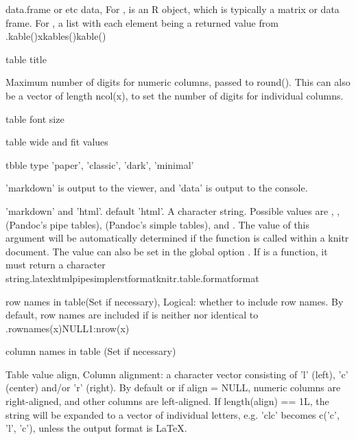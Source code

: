 \documentclass[a4paper]{book}
\begin{document}
\begin{Arguments}
\begin{ldescription}
\item[\code{data}] data.frame or etc data, For , is an R object, which is typically a matrix or data frame. For , a list with each element being a returned value from .kable()xkables()kable()

\item[\code{caption}] table title

\item[\code{digits}] Maximum number of digits for numeric columns, passed to round(). This can also be a vector of length ncol(x), to set the number of digits for individual columns.

\item[\code{font\_size}] table font size

\item[\code{full\_width}] table wide and fit values

\item[\code{table}] tbble type 'paper', 'classic', 'dark', 'minimal'

\item[\code{show}] 'markdown' is output to the viewer, and 'data' is output to the console.

\item[\code{format}] 'markdown' and 'html'. default 'html'. A character string. Possible values are , , (Pandoc's pipe tables), (Pandoc's simple tables), and . The value of this argument will be automatically determined if the function is called within a knitr document. The value can also be set in the global option . If is a function, it must return a character string.latexhtmlpipesimplerstformatknitr.table.formatformat

\item[\code{row.names}] row names in table(Set if necessary), Logical: whether to include row names. By default, row names are included if is neither nor identical to .rownames(x)NULL1:nrow(x)

\item[\code{col.names}] column names in table (Set if necessary)

\item[\code{align}] Table value align, Column alignment: a character vector consisting of 'l' (left), 'c' (center) and/or 'r' (right). By default or if align = NULL, numeric columns are right-aligned, and other columns are left-aligned. If length(align) == 1L, the string will be expanded to a vector of individual letters, e.g. 'clc' becomes c('c', 'l', 'c'), unless the output format is LaTeX.


\end{ldescription}
\end{Arguments}
\end{document}
